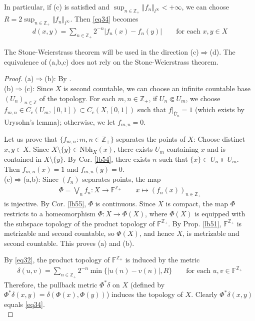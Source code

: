 \documentclass[12pt,b5paper,notitlepage]{article}
\theoremstyle{definition}
\theoremstyle{plain}
\newcommand{\ovl}{\overline}
\newcommand{\Zbb}{\mathbb Z}
\newcommand{\Fbb}{\mathbb F}
\newcommand{\Nbh}{\mathrm{Nbh}}
\numberwithin{equation}{section}
\begin{document}
In particular, if (c) is satisfied and $\sup_{n\in\Zbb_+}\Vert f_n\Vert_{l^\infty}<+\infty$, we can choose $R=2\sup_{n\in\Zbb_+}\Vert f_n\Vert_{l^\infty}$. Then \eqref{eq34} becomes
\begin{gather}\label{eq35}
d(x,y)=\sum_{n\in\Zbb_+}2^{-n}|f_n(x)-f_n(y)|\qquad\text{for each }x,y\in X
\end{gather}



The Stone-Weierstrass theorem will be used in the direction (c)$\Rightarrow$(d). The equivalence of (a,b,c) does not rely on the Stone-Weierstrass theorem.

\begin{proof}
(a)$\Rightarrow$(b): By .\\[-1ex]

(b)$\Rightarrow$(c): Since $X$ is second countable, we can choose an infinite countable base $(U_n)_{n\in\Zbb}$ of the topology. For each $m,n\in\Zbb_+$, if $U_n\Subset U_m$, we choose $f_{m,n}\in C_c(U_m,[0,1])\subset C_c(X,[0,1])$ such that $f|_{\ovl U_n}=1$ (which exists by Urysohn's lemma); otherwise, we let $f_{m,n}=0$. 

Let us prove that $\{f_{m,n}:m,n\in\Zbb_+\}$ separates the points of $X$: Choose distinct $x,y\in X$. Since $X\setminus\{y\}\in\Nbh_X(x)$, there exists $U_m$ containing $x$ and is contained in $X\setminus\{y\}$. By Cor. \ref{lb54}, there exists $n$ such that $\{x\}\subset U_n\Subset U_m$. Then $f_{m,n}(x)=1$ and $f_{m,n}(y)=0$.\\[-1ex]

(c)$\Rightarrow$(a,b): Since $(f_n)$ separates points, the map
\begin{gather*}
\Phi=\bigvee_n f_n:X\rightarrow\Fbb^{\Zbb_+}\qquad x\mapsto (f_n(x))_{n\in\Zbb_+}
\end{gather*}
is injective. By Cor. \ref{lb55}, $\Phi$ is continuous. Since $X$ is compact, the map $\Phi$ restricts to a homeomorphism $\Phi:X\rightarrow\Phi(X)$, where $\Phi(X)$ is equipped with the subspace topology of the product topology of $\Fbb^{\Zbb_+}$. By Prop. \ref{lb51}, $\Fbb^{\Zbb_+}$ is metrizable and second countable, so $\Phi(X)$, and hence $X$, is metrizable and second countable. This proves (a) and (b).

By \eqref{eq32}, the product topology of $\Fbb^{\Zbb_+}$ is induced by the metric
\begin{align*}
\delta(u,v)=\sum_{n\in\Zbb_+}2^{-n}\min\{|u(n)-v(n)|,R\}\qquad\text{for each }u,v\in\Fbb^{\Zbb_+}
\end{align*}
Therefore, the pullback metric $\Phi^*\delta$ on $X$ (defined by $\Phi^*\delta(x,y)=\delta(\Phi(x),\Phi(y))$) induces the topology of $X$. Clearly $\Phi^*\delta(x,y)$ equals \eqref{eq34}. \\[-1ex]


\end{proof}
\end{document}
